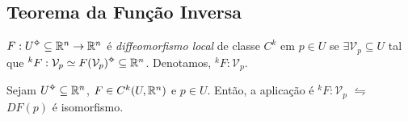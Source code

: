\subsection*{Teorema da Função Inversa}

\begin{definition}
    \(F : U\ab\subseteq \R^n\to \R^n\) é \emph{diffeomorfismo local} de classe \(C^k\) em \(p\in U\) se \(\exists \mathcal{V}_p\subseteq U\) tal que \(^k F: \mathcal{V}_p\simeq F(\mathcal{V}_p)\ab \subseteq \R^n\). Denotamos, \(^k F: \mathcal{V}_p\). 
\end{definition}


\begin{theorem}
\hypertarget{thmTFI}{}
    Sejam \(U\ab \subseteq \R^n\), \(F \in C^k(U, \mathbb{R}^n)\) e \(p\in U\). Então, a aplicação  é \(^k F : \mathcal{V}_p\) \(\leftrightharpoons\) \(DF(p)\) é isomorfismo.  
\end{theorem}

